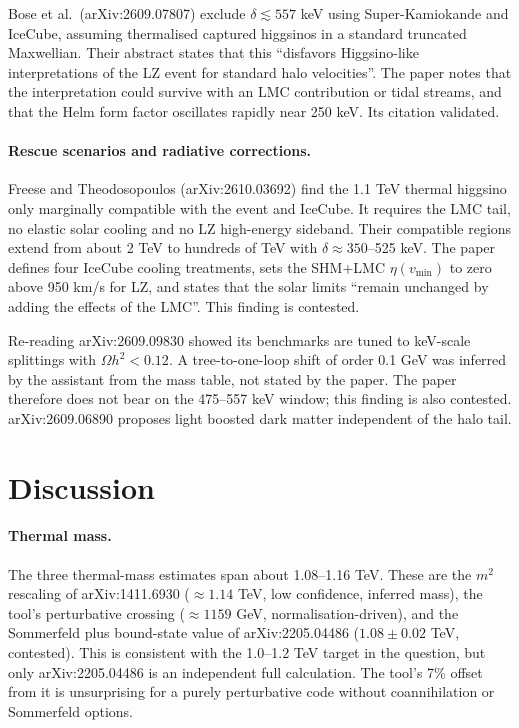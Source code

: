\documentclass[11pt,a4paper]{article}
\begin{document}
Bose et al.\ (arXiv:2609.07807) exclude $\delta\lesssim557$ keV using Super-Kamiokande and IceCube, assuming thermalised captured higgsinos in a standard truncated Maxwellian. Their abstract states that this ``disfavors Higgsino-like interpretations of the LZ event for standard halo velocities''. The paper notes that the interpretation could survive with an LMC contribution or tidal streams, and that the Helm form factor oscillates rapidly near 250 keV. Its citation validated.

\paragraph{Rescue scenarios and radiative corrections.} Freese and Theodosopoulos (arXiv:2610.03692) find the 1.1 TeV thermal higgsino only marginally compatible with the event and IceCube. It requires the LMC tail, no elastic solar cooling and no LZ high-energy sideband. Their compatible regions extend from about 2 TeV to hundreds of TeV with $\delta\approx350$--525 keV. The paper defines four IceCube cooling treatments, sets the SHM+LMC $\eta(v_{\min})$ to zero above 950 km/s for LZ, and states that the solar limits ``remain unchanged by adding the effects of the LMC''. This finding is contested.

Re-reading arXiv:2609.09830 showed its benchmarks are tuned to keV-scale splittings with $\Omega h^2<0.12$. A tree-to-one-loop shift of order 0.1 GeV was inferred by the assistant from the mass table, not stated by the paper. The paper therefore does not bear on the 475--557 keV window; this finding is also contested. arXiv:2609.06890 proposes light boosted dark matter independent of the halo tail.

\section{Discussion}

\paragraph{Thermal mass.} The three thermal-mass estimates span about 1.08--1.16 TeV. These are the $m^2$ rescaling of arXiv:1411.6930 ($\approx1.14$ TeV, low confidence, inferred mass), the tool's perturbative crossing ($\approx1159$ GeV, normalisation-driven), and the Sommerfeld plus bound-state value of arXiv:2205.04486 ($1.08\pm0.02$ TeV, contested). This is consistent with the 1.0--1.2 TeV target in the question, but only arXiv:2205.04486 is an independent full calculation. The tool's 7\% offset from it is unsurprising for a purely perturbative code without coannihilation or Sommerfeld options.
\end{document}
